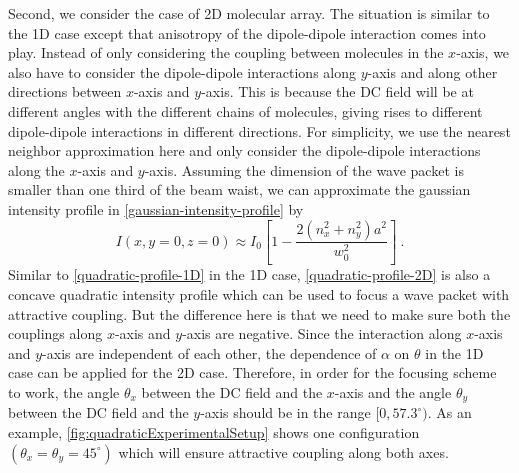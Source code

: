 Second, we consider the case of 2D molecular array. The situation is similar to the 1D case except that anisotropy
of the dipole-dipole interaction comes into play. Instead of only considering the coupling between molecules in 
the $x$-axis, we also have to consider the dipole-dipole interactions along $y$-axis and along other directions
between $x$-axis and $y$-axis. This is because the DC field will be at different angles with the different chains of 
molecules, giving rises to different dipole-dipole interactions in different directions. For simplicity, we use the
 nearest neighbor approximation here and only consider
the dipole-dipole interactions along the $x$-axis and $y$-axis. Assuming the dimension of the wave packet is
 smaller than one third of the beam waist, we can approximate the gaussian intensity profile in
\autoref{gaussian-intensity-profile} by
\begin{equation}
I(x, y=0, z=0) \approx I_{0}\left[1- \frac{2 \left(n_x^2 + n_y^2 \right) a^2}{w_0^2}\right] \ .  \label{quadratic-profile-2D} 
\end{equation}
Similar to \autoref{quadratic-profile-1D} in the 1D case, \autoref{quadratic-profile-2D} is also a concave quadratic
 intensity profile which can be used to focus a wave packet with attractive coupling. But the difference here is
 that we need to make sure both the couplings along $x$-axis and $y$-axis are negative. Since the interaction
 along $x$-axis and $y$-axis are independent of each other, the dependence of $\alpha$ on $\theta$ in the 1D
case can be applied for the 2D case. Therefore, in order for the focusing scheme to work, the angle $\theta_x$ 
between the DC field and the $x$-axis and the angle $\theta_y$ between the DC field and the $y$-axis should be
in the range  $[0, 57.3^{\circ})$. As an example, \autoref{fig:quadraticExperimentalSetup} shows one 
configuration $(\theta_x = \theta_y = 45^\circ)$ which will ensure attractive coupling along both axes. 



